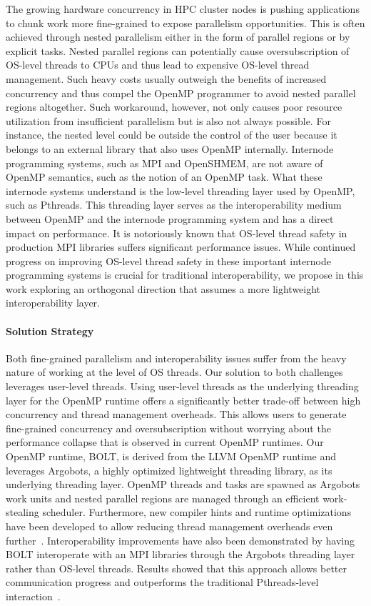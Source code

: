 The growing hardware concurrency in HPC
cluster nodes is pushing applications to chunk work more fine-grained
to expose parallelism opportunities.  This is often achieved through
nested parallelism either in the form of parallel regions or by
explicit tasks.  Nested parallel regions can potentially cause
oversubscription of OS-level threads to CPUs and thus lead to
expensive OS-level thread management.  Such heavy costs usually
outweigh the benefits of increased concurrency and thus compel the
OpenMP programmer to avoid nested parallel regions altogether.  Such
workaround, however, not only causes poor resource utilization from
insufficient parallelism but is also not always possible.  For
instance, the nested level could be outside the control of the user
because it belongs to an external library that also uses OpenMP
internally.  Internode programming systems, such as MPI and OpenSHMEM,
are not aware of OpenMP semantics, such as the notion of an OpenMP
task.  What these internode systems understand is the low-level
threading layer used by OpenMP, such as Pthreads.  This threading
layer serves as the interoperability medium between OpenMP and the
internode programming system and has a direct impact on performance.
It is notoriously known that OS-level thread safety in production MPI
libraries suffers significant performance issues. While continued
progress on improving OS-level thread safety in these important
internode programming systems is crucial for traditional
interoperability, we propose in this work exploring an orthogonal
direction that assumes a more lightweight interoperability layer.

\paragraph{Solution Strategy}

Both fine-grained parallelism and interoperability issues suffer from
the heavy nature of working at the level of OS threads.  Our solution
to both challenges leverages user-level threads.  Using user-level
threads as the underlying threading layer for the OpenMP runtime
offers a significantly better trade-off between high concurrency and
thread management overheads.  This allows users to generate
fine-grained concurrency and oversubscription without worrying about
the performance collapse that is observed in current OpenMP runtimes.
Our OpenMP runtime, BOLT, is derived from the LLVM OpenMP runtime and
leverages Argobots, a highly optimized lightweight threading library,
as its underlying threading layer.  OpenMP threads and tasks are
spawned as Argobots work units and nested parallel regions are managed
through an efficient work-stealing scheduler.  Furthermore, new
compiler hints and runtime optimizations have been developed to allow
reducing thread management overheads even further~\cite{iwasaki2018,
iwasaki2020}. Interoperability improvements have also been
demonstrated by having BOLT interoperate with an MPI libraries through
the Argobots threading layer rather than OS-level threads.  Results
showed that this approach allows better communication progress and
outperforms the traditional Pthreads-level interaction~\cite{seo2018}.

